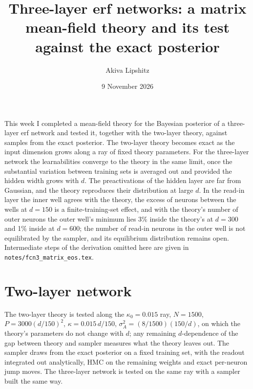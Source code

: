 \documentclass[11pt,a4paper]{article}
\title{Three-layer erf networks: a matrix mean-field theory and its test against the exact posterior}
\author{Akiva Lipshitz}
\date{9 November 2026}
\begin{document}
\maketitle

This week I completed a mean-field theory for the Bayesian posterior of a three-layer erf network and tested it, together
with the two-layer theory, against samples from the exact posterior. The two-layer theory becomes exact as the input
dimension grows along a ray of fixed theory parameters. For the three-layer network the learnabilities converge to the
theory in the same limit, once the substantial variation between training sets is averaged out and provided the hidden
width grows with $d$. The preactivations of the hidden layer are far from Gaussian, and the theory reproduces their
distribution at large $d$. In the read-in layer the inner well agrees with the theory, the excess of neurons between the wells
at $d=150$ is a finite-training-set effect, and with the theory's number of outer neurons the outer well's minimum lies
3\% inside the theory's at $d=300$ and 1\% inside at $d=600$; the number of read-in neurons in the outer well is not
equilibrated by the sampler, and its equilibrium distribution remains open. Intermediate steps of the derivation omitted here are given in
\texttt{notes/fcn3\_matrix\_eos.tex}.

\section{Two-layer network}
The two-layer theory is tested along the $\kappa_0=0.015$ ray, $N=1500$, $P=3000(d/150)^2$, $\kappa=0.015\,d/150$,
$\sigma_A^2=(8/1500)(150/d)$, on which the theory's parameters do not change with $d$; any remaining $d$-dependence of the
gap between theory and sampler measures what the theory leaves out. The sampler draws from the exact posterior on a
fixed training set, with the readout integrated out analytically, HMC on the remaining weights and exact per-neuron
jump moves. The three-layer network is tested on the same ray with a sampler built the same way.
\end{document}
